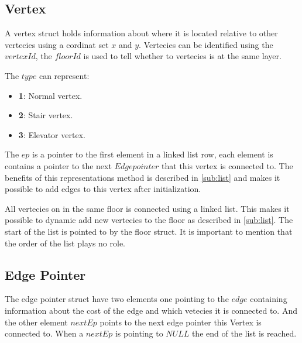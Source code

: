 \begin{minipage}{\linewidth}
\subsection{Vertex}\label{data_struct:vertex}
A vertex struct holds information about where it is located relative to other vertecies using a cordinat set $x$ and $y$. Vertecies can be identified using the $vertexId$, the $floorId$ is used to tell whether to vertecies is at the same layer.

 The $type$ can represent:
\begin{itemize}[noitemsep]
	\item \textbf{1}: Normal vertex.
	\item \textbf{2}: Stair vertex.
	\item \textbf{3}: Elevator vertex.
\end{itemize}

The $ep$ is a pointer to the first element in a linked list row, each element is contains a pointer to the next $Edge pointer$ that this vertex is connected to. The benefits of this representations method is described in \cref{sub:list} and makes it possible to add edges to this vertex after initialization.


All vertecies on in the same floor is connected using a linked list. This makes it possible to dynamic add new vertecies to the floor as described in \cref{sub:list}. The start of the list is pointed to by the floor struct. It is important to mention that the order of the list plays no role.   


 \label{vertex_struct}
\end{minipage}

\begin{minipage}{\linewidth}
\subsection{Edge Pointer}
The edge pointer struct have two elements one pointing to the $edge$ containing information about the cost of the edge and which vetecies it is connected to. And the other element $nextEp$ points to the next edge pointer this Vertex is connected to. When a $nextEp$ is pointing to $NULL$ the end of the list is reached.
 \label{ep_struct}
\end{minipage}



